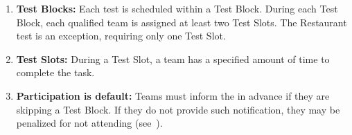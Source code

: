 \begin{enumerate}
	\item \textbf{Test Blocks:} Each test is scheduled within a Test Block. During each Test Block, each qualified team is assigned at least two Test Slots. The Restaurant test is an exception, requiring only one Test Slot.

	\item \textbf{Test Slots:} During a Test Slot, a team has a specified amount of time to complete the task.

	\item \textbf{Participation is default:} Teams must inform the \OC{} in advance if they are skipping a Test Block. If they do not provide such notification, they may be penalized for not attending (see~).
	
\end{enumerate}


